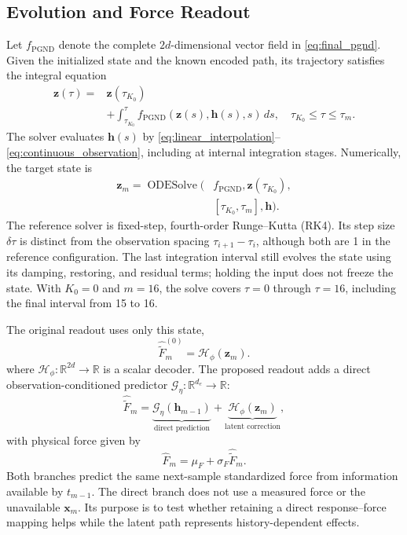 \documentclass[journal,twoside]{IEEEtran}
\begin{document}
\subsection{Evolution and Force Readout}
\label{subsec:force_reconstruction}
Let $f_{\mathrm{PGND}}$ denote the complete $2d$-dimensional vector field
in \eqref{eq:final_pgnd}. Given the initialized state and the known encoded
path, its trajectory satisfies the integral equation
\begin{equation}
\begin{aligned}
    \mathbf z(\tau)={}&\mathbf z(\tau_{K_0})\\
    &+\int_{\tau_{K_0}}^{\tau}
    f_{\mathrm{PGND}}(\mathbf z(s),\mathbf h(s),s)\,ds,
    \quad \tau_{K_0}\leq\tau\leq\tau_m.
\end{aligned}
    \label{eq:node_integral}
\end{equation}
The solver evaluates $\mathbf h(s)$ by
\eqref{eq:linear_interpolation}--\eqref{eq:continuous_observation},
including at internal integration stages. Numerically, the target state is
\begin{equation}
\begin{aligned}
    \mathbf z_m=\operatorname{ODESolve}\big(&f_{\mathrm{PGND}},
    \mathbf z(\tau_{K_0}),\\
    &[\tau_{K_0},\tau_m],\mathbf h\big).
\end{aligned}
    \label{eq:ode_solver}
\end{equation}
The reference solver is fixed-step, fourth-order Runge--Kutta (RK4).
Its step size $\delta\tau$ is distinct from the observation spacing
$\tau_{i+1}-\tau_i$, although both are 1 in the reference configuration.
The last integration interval still evolves the state using its damping,
restoring, and residual terms; holding the input does not freeze the
state. With $K_0=0$ and $m=16$, the solve covers $\tau=0$ through
$\tau=16$, including the final interval from 15 to 16.

The original readout uses only this state,
\begin{equation}
    \hat{\tilde F}^{(0)}_m=\mathcal H_\phi(\mathbf z_m).
    \label{eq:latent_only_decoder}
\end{equation}
where $\mathcal H_\phi:\mathbb R^{2d}\to\mathbb R$ is a scalar decoder.
The proposed readout adds a direct observation-conditioned predictor
$\mathcal G_\eta:\mathbb R^{d_e}\to\mathbb R$:
\begin{equation}
    \hat{\tilde F}_m=
    \underbrace{\mathcal G_\eta(\mathbf h_{m-1})}_{\text{direct prediction}}
    +\underbrace{\mathcal H_\phi(\mathbf z_m)}_{\text{latent correction}},
    \label{eq:force_decoder}
\end{equation}
with physical force given by
\begin{equation}
    \hat F_m=\mu_F+\sigma_F\hat{\tilde F}_m.
    \label{eq:force_reconstruction}
\end{equation}
Both branches predict the same next-sample standardized force from
information available by $t_{m-1}$. The direct branch does not use a
measured force or the unavailable $\mathbf x_m$. Its purpose is to test
whether retaining a direct response--force mapping helps while the latent
path represents history-dependent effects.
\end{document}
